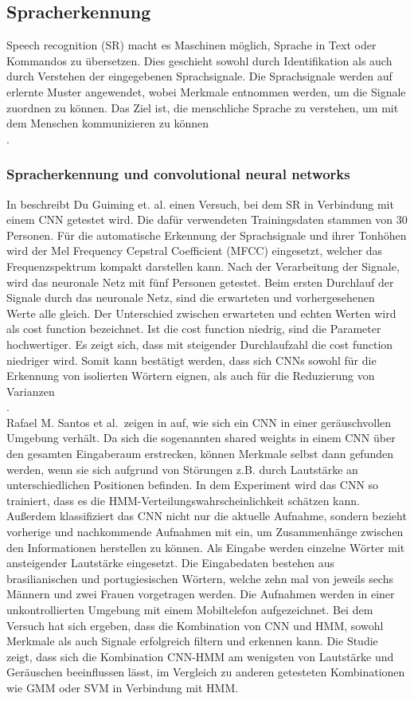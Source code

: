 \subsection{Spracherkennung}
Speech recognition (SR) macht es Maschinen möglich, Sprache in Text oder Kommandos zu übersetzen. Dies geschieht sowohl durch Identifikation als auch durch Verstehen der eingegebenen Sprachsignale. Die Sprachsignale werden auf erlernte Muster angewendet, wobei Merkmale entnommen werden, um die Signale zuordnen zu können. Das Ziel ist, die menschliche Sprache zu verstehen, um mit dem Menschen kommunizieren zu können \cite{technology}\\.

\subsubsection{Spracherkennung und convolutional neural networks}
In \cite{usingcnn} beschreibt Du Guiming et. al. einen Versuch, bei dem SR in Verbindung mit einem CNN getestet wird. Die dafür verwendeten Trainingsdaten stammen von 30 Personen. Für die automatische Erkennung der Sprachsignale und ihrer Tonhöhen wird der Mel Frequency Cepstral Coefficient (MFCC) \cite{MFCC} eingesetzt, welcher das Frequenzspektrum kompakt darstellen kann. Nach der Verarbeitung der Signale, wird das neuronale Netz mit fünf Personen getestet. Beim ersten Durchlauf der Signale durch das neuronale Netz, sind die erwarteten und vorhergesehenen Werte alle gleich. Der Unterschied zwischen erwarteten und echten Werten wird als cost function bezeichnet. Ist die cost function niedrig, sind die Parameter hochwertiger. Es zeigt sich, dass mit steigender Durchlaufzahl die cost function niedriger wird. Somit kann bestätigt werden, dass sich CNNs sowohl für die Erkennung von isolierten Wörtern eignen, als auch für die Reduzierung von Varianzen \cite{usingcnn}\\.
\\
Rafael M. Santos et al.~zeigen in \cite{noisycnn} auf, wie sich ein CNN in einer geräuschvol\-len Umgebung verhält. Da sich die sogenannten shared weights in einem CNN über den gesamten Eingaberaum erstrecken, können Merkmale selbst dann gefunden werden, wenn sie sich aufgrund von Störungen z.B. durch Lautstärke an unterschiedlichen Positionen befinden. In dem Experiment wird das CNN so trainiert, dass es die HMM-Verteilungswahrscheinlich\-keit schätzen kann. Außerdem klassifiziert das CNN nicht nur die aktuelle Aufnahme, sondern bezieht vorherige und nachkommende Aufnahmen mit ein, um Zusammenhän\-ge zwischen den Informationen herstellen zu können. Als Eingabe werden einzel\-ne Wörter mit ansteigender Lautstärke eingesetzt. Die Eingabedaten bestehen aus brasilianischen und portugiesischen Wörtern, welche zehn mal von jeweils sechs Männern und zwei Frauen vorgetragen werden. Die Aufnahmen werden in einer unkontrollierten Umgebung mit einem Mobiltelefon aufgezeichnet. Bei dem Versuch hat sich ergeben, dass die Kombination von CNN und HMM, sowohl Merkmale als auch Signale erfolgreich filtern und erkennen kann. Die Studie zeigt, dass sich die Kombination CNN-HMM am wenigsten von Lautstärke und Geräuschen beeinflussen lässt, im Vergleich zu anderen getesteten Kombinationen wie GMM \cite{svmgmm} oder SVM \cite{svmgmm} in Verbindung mit HMM.

